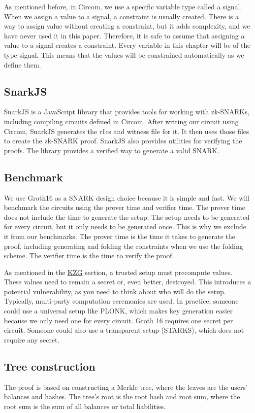As mentioned before, in Circom, we use a specific variable type called a signal. When we assign a value to a signal, a constraint is usually created.
There is a way to assign value without creating a constraint, but it adds complexity, and we have never used it in this paper. 
Therefore, it is safe to assume that assigning a value to a signal creates a constraint. 
Every variable in this chapter will be of the type signal.
This means that the values will be constrained automatically as we define them. 
\subsection{SnarkJS} 

SnarkJS is a JavaScript library that provides tools for working with zk-SNARKs, including compiling circuits defined in Circom. 
After writing our circuit using Circom, SnarkJS generates the r1cs and witness file for it. It then uses those files to create the zk-SNARK proof.
SnarkJS also provides utilities for verifying the proofs. The library provides a verified way to generate a valid SNARK.

\subsection{Benchmark} 
We use Groth16 as a SNARK design choice because it is simple and fast. 
We will benchmark the circuits using the prover time and verifier time. The prover time does not include the time to generate the setup.
The setup needs to be generated for every circuit, but it only needs to be generated once. This is why we exclude it from our benchmarks.
The prover time is the time it takes to generate the proof, including generating and folding the constraints when we use the folding scheme. 
The verifier time is the time to verify the proof.

As mentioned in the \hyperref[subsec:plc]{KZG} section, a trusted setup must precompute values. These values need to remain a secret or, even better, destroyed.
This introduces a potential vulnerability, as you need to think about who will do the setup. Typically, multi-party computation ceremonies are used.
In practice, someone could use a universal setup like PLONK, which makes key generation easier because we only need one for every circuit. Groth 16 requires one secret per circuit.
Someone could also use a transparent setup (STARKS), which does not require any secret.

\subsection{Tree construction}
The proof is based on constructing a Merkle tree, where the leaves are the users' balances and hashes. The tree's root is the root hash and root sum, where the root sum is the sum of all balances or total liabilities.

